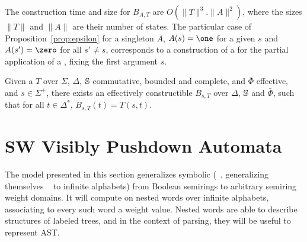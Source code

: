 \noindent
The construction time and size for $B_{A, T}$ are $O(\| T \|^3 . \| A \|^2)$,
where the sizes $\| T \|$ and $\| A \|$ are their number of states.
%
The particular case of Proposition~\ref{prop:epsilon} for a singleton $A$,
\ie $A(s) = \one$ for a given $s$ and $A(s') = \zero$ for all $s' \neq s$, 
corresponds to a construction of a \SWA for the partial application of a \SWT, 
fixing the first argument $s$.
\begin{corollary} \label{cor:epsilon}
Given a \SWT $T$ over $\Sigma$, $\Delta$,
$\mathbb{S}$ commutative, bounded and complete,
and $\bar\Phi$ effective,
and $s \in \Sigma^+$,
there exists an effectively constructible \SWA
$B_{s, T}$ over $\Delta$, $\mathbb{S}$ and $\bar\Phi$,
such that for all $t \in \Delta^*$, $B_{s, T}(t) = T(s, t)$.
\end{corollary}











\section{SW Visibly Pushdown Automata}
\label{section:SWVPA}\label{sec:SWVPA}
The model presented in this section generalizes symbolic \VPA
(\SVPA~\cite{dAntonyAlur14SVPDA},
 generalizing themselves \VPA~\cite{AlurMadhusudan09nested} to infinite alphabets)
from Boolean semirings to arbitrary semiring weight domains.
It will compute on nested words over infinite alphabets,
associating to every such word a weight value.
Nested words are able to describe structures of labeled trees,
and in the context of parsing, they will be useful to
represent AST. %

